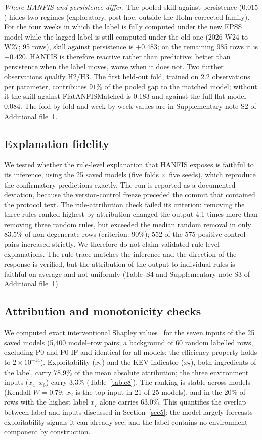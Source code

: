 \documentclass[referee,lineno,pdflatex,sn-basic]{sn-jnl}%
\theoremstyle{thmstyleone}%
\theoremstyle{thmstyletwo}%
\theoremstyle{thmstylethree}%
\begin{document}
\emph{Where HANFIS and persistence differ.} The pooled skill against persistence ($0.015$) hides two regimes (exploratory, post hoc, outside the Holm-corrected family). For the four weeks in which the label is fully computed under the new EPSS model while the lagged label is still computed under the old one (2026-W24 to W27; 95 rows), skill against persistence is $+0.483$; on the remaining 985 rows it is $-0.420$. HANFIS is therefore reactive rather than predictive: better than persistence when the label moves, worse when it does not. Two further observations qualify H2/H3. The first held-out fold, trained on 2.2 observations per parameter, contributes $91\%$ of the pooled gap to the matched model; without it the skill against FlatANFISMatched is $0.183$ and against the full flat model $0.084$. The fold-by-fold and week-by-week values are in Supplementary note S2 of Additional file~1.

\subsection{Explanation fidelity}\label{sec:e6}
We tested whether the rule-level explanation that HANFIS exposes is faithful to its inference, using the 25 saved models (five folds $\times$ five seeds), which reproduce the confirmatory predictions exactly. The run is reported as a documented deviation, because the version-control freeze preceded the commit that contained the protocol text. The rule-attribution check failed its criterion: removing the three rules ranked highest by attribution changed the output 4.1 times more than removing three random rules, but exceeded the median random removal in only 83.5\% of non-degenerate rows (criterion: 90\%); 552 of the 575 positive-control pairs increased strictly. We therefore do not claim validated rule-level explanations. The rule trace matches the inference and the direction of the response is verified, but the attribution of the output to individual rules is faithful on average and not uniformly (Table~S4 and Supplementary note S3 of Additional file~1).

\subsection{Attribution and monotonicity checks}\label{subsec:e8}
We computed exact interventional Shapley values~\citep{shapley1953value} for the seven inputs of the 25 saved models (5{,}400 model--row pairs; a background of 60 random labelled rows, excluding P0 and P0-IF and identical for all models; the efficiency property holds to $2\times10^{-14}$). Exploitability ($x_2$) and the KEV indicator ($x_7$), both ingredients of the label, carry 78.9\% of the mean absolute attribution; the three environment inputs ($x_4$--$x_6$) carry 3.3\% (Table~\ref{tab:e8}). The ranking is stable across models (Kendall $W=0.79$; $x_2$ is the top input in 21 of 25 models), and in the 20\% of rows with the highest label $x_7$ alone carries 63.0\%. This quantifies the overlap between label and inputs discussed in Section~\ref{sec5}: the model largely forecasts exploitability signals it can already see, and the label contains no environment component by construction.
\end{document}
